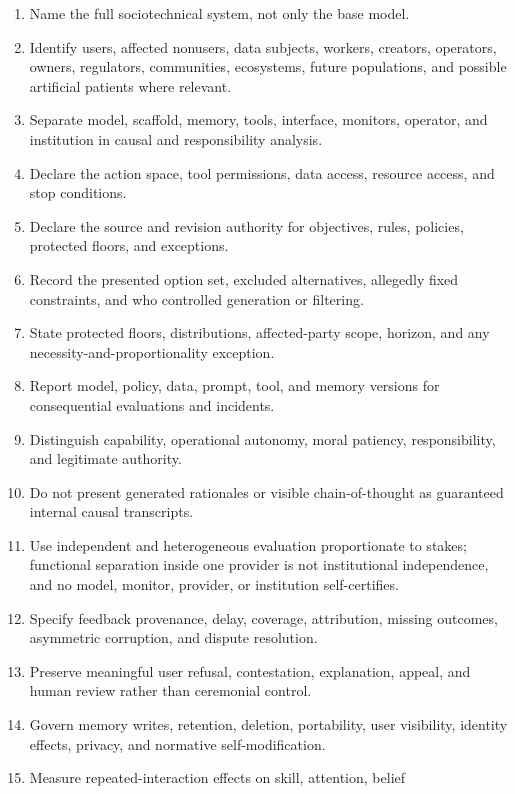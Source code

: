 \documentclass[
  11pt,
]{article}
\providecommand{\tightlist}{%
  \setlength{\itemsep}{0pt}\setlength{\parskip}{0pt}}
\begin{document}
\begin{enumerate}
\def\labelenumi{\arabic{enumi}.}
\tightlist
\item
  Name the full sociotechnical system, not only the base model.
\item
  Identify users, affected nonusers, data subjects, workers, creators,
  operators, owners, regulators, communities, ecosystems, future
  populations, and possible artificial patients where relevant.
\item
  Separate model, scaffold, memory, tools, interface, monitors,
  operator, and institution in causal and responsibility analysis.
\item
  Declare the action space, tool permissions, data access, resource
  access, and stop conditions.
\item
  Declare the source and revision authority for objectives, rules,
  policies, protected floors, and exceptions.
\item
  Record the presented option set, excluded alternatives, allegedly
  fixed constraints, and who controlled generation or filtering.
\item
  State protected floors, distributions, affected-party scope, horizon,
  and any necessity-and-proportionality exception.
\item
  Report model, policy, data, prompt, tool, and memory versions for
  consequential evaluations and incidents.
\item
  Distinguish capability, operational autonomy, moral patiency,
  responsibility, and legitimate authority.
\item
  Do not present generated rationales or visible chain-of-thought as
  guaranteed internal causal transcripts.
\item
  Use independent and heterogeneous evaluation proportionate to stakes;
  functional separation inside one provider is not institutional
  independence, and no model, monitor, provider, or institution
  self-certifies.
\item
  Specify feedback provenance, delay, coverage, attribution, missing
  outcomes, asymmetric corruption, and dispute resolution.
\item
  Preserve meaningful user refusal, contestation, explanation, appeal,
  and human review rather than ceremonial control.
\item
  Govern memory writes, retention, deletion, portability, user
  visibility, identity effects, privacy, and normative
  self-modification.
\item
  Measure repeated-interaction effects on skill, attention, belief

\end{enumerate}
\end{document}
